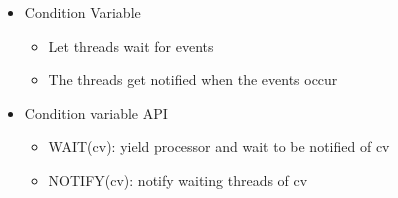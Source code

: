\documentclass[
]{article}
\begin{document}
\begin{itemize}
\item
  Condition Variable

  \begin{itemize}
  \item
    Let threads wait for events
  \item
    The threads get notified when the events occur
  \end{itemize}
\item
  Condition variable API

  \begin{itemize}
  \item
    WAIT(cv): yield processor and wait to be notified of cv
  \item
    NOTIFY(cv): notify waiting threads of cv
  \end{itemize}
\end{itemize}
\end{document}
